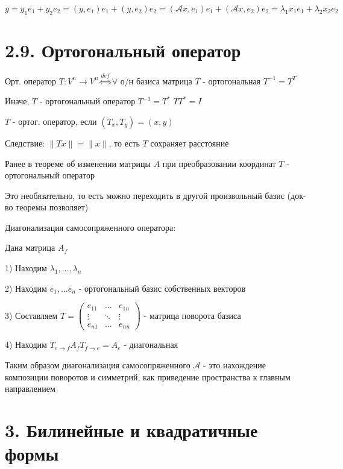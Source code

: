 \documentclass[12pt]{article}
\begin{document}
    \Ex

    $\displaystyle y = y_1 e_1 + y_2 e_2 = (y, e_1) e_1 + (y, e_2) e_2 = (\mathcal{A}x, e_1) e_1 + (\mathcal{A}x, e_2) e_2 = \lambda_1 x_1 e_1 + \lambda_2 x_2 e_2$

    \section{2.9. Ортогональный оператор}

    \Mem Орт. оператор $\displaystyle T: V^n \to V^n \overset{def}{\Longleftrightarrow} \forall$ о/н базиса матрица $T$ - ортогональная $\displaystyle T^{-1} = T^T$

    \Nota Иначе, $T$ - ортогональный оператор \Longleftrightarrow $\displaystyle T^{-1} = T^*$ \Longrightarrow $\displaystyle T T^* = I$

    \Def $T$ - ортог. оператор, если $\displaystyle (T_x, T_y) = (x, y)$

    Следствие: $\|Tx\| = \|x\|$, то есть $T$ сохраняет расстояние

    \Nota Ранее в теореме об изменении матрицы $A$ при преобразовании координат $T$ - ортогональный оператор

    Это необязательно, то есть можно переходить в другой произвольный базис (док-во теоремы позволяет)

    Диагонализация самосопряженного оператора:

    Дана матрица $\displaystyle A_f$

    1) Находим $\displaystyle \lambda_1, \dots, \lambda_n$

    2) Находим $\displaystyle e_1, \dots e_n$ - ортогональный базис собственных векторов

    3) Составляем $\displaystyle T = \begin{pmatrix}e_{11} & \dots & e_{1n} \\ \vdots & \ddots & \vdots \\ e_{n1} & \dots & e_{nn}\end{pmatrix}$ - матрица поворота базиса

    4) Находим $\displaystyle T_{e\to f}A_f T_{f\to e} = A_e$ - диагональная

    Таким образом диагонализация самосопряженного $\mathcal{A}$ - это нахождение композиции поворотов и симметрий,
    как приведение пространства к главным направлением

    \clearpage

    \section{3. Билинейные и квадратичные формы}
\end{document}
